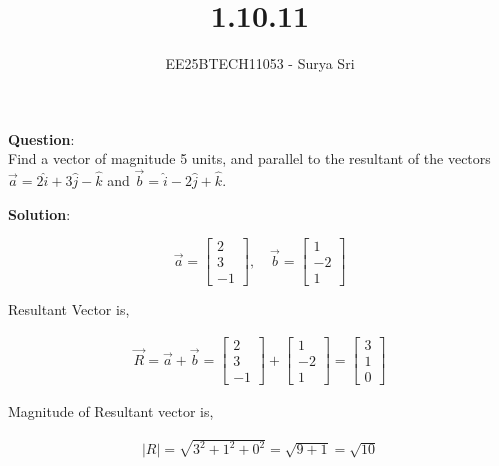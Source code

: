 \documentclass[journal]{IEEEtran}
\begin{document}

\vspace{3cm}

\title{1.10.11}
\author{EE25BTECH11053 - Surya Sri}
{\let\newpage\relax\maketitle}

\renewcommand{\thefigure}{\theenumi}
\renewcommand{\thetable}{\theenumi}
\setlength{\intextsep}{10pt} %

\textbf{Question}:\\
Find a vector of magnitude 5 units, and parallel to the resultant of the vectors $\vec{a} = 2\hat{i} + 3\hat{j} - \hat{k}$ and $\vec{b} = \hat{i} - 2\hat{j} + \hat{k}$.


\bigskip
\textbf{Solution}:

$$
\vec{a} = \begin{bmatrix} 2 \\ 3 \\ -1 \end{bmatrix}, \quad
\vec{b} = \begin{bmatrix} 1 \\ -2 \\ 1 \end{bmatrix}
$$

 Resultant Vector is,

\begin{align}
\vec{R} = \vec{a} + \vec{b} = 
\begin{bmatrix} 2 \\ 3 \\ -1 \end{bmatrix} + \begin{bmatrix} 1 \\ -2 \\ 1 \end{bmatrix}
= \begin{bmatrix} 3 \\ 1 \\ 0 \end{bmatrix}
\end{align}

Magnitude of Resultant vector is,

\begin{align}
|{R}| = \sqrt{3^2 + 1^2 + 0^2} = \sqrt{9 + 1} = \sqrt{10}
\end{align}
\end{document}
